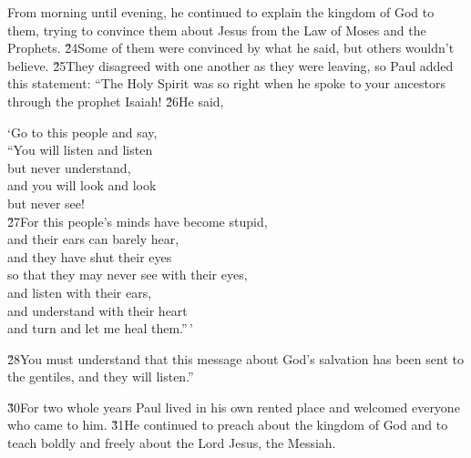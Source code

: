 From morning until evening, he continued to explain the kingdom of God to them, trying to convince them about Jesus from the Law of Moses and the Prophets. \v{24}Some of them were convinced by what he said, but others wouldn't believe. \v{25}They disagreed with one another as they were leaving, so Paul added this statement: ``The Holy Spirit was so right when he spoke to your ancestors through the prophet Isaiah! \v{26}He said,

\begin{poetry}
\poeml `Go to this people and say, \\
\poemll    ``You will listen and listen \\
\poemlll       but never understand, \\
\poemll    and you will look and look \\
\poemlll       but never see! \\
\poeml \v{27}For this people's minds have become stupid, \\
\poemll    and their ears can barely hear, \\
\poeml and they have shut their eyes \\
\poemll    so that they may never see with their eyes, \\
\poeml and listen with their ears, \\
\poemll    and understand with their heart \\
\poeml and turn and let me heal them.''\,'
\end{poetry}

\v{28}You must understand that this message about God's salvation has been sent to the gentiles, and they will listen.''

\v{30}For two whole years Paul lived in his own rented place and welcomed everyone who came to him. \v{31}He continued to preach about the kingdom of God and to teach boldly and freely about the Lord Jesus, the Messiah.
